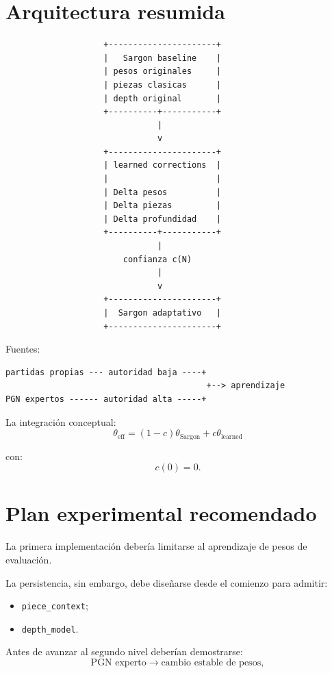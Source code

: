 \documentclass[11pt,a4paper]{article}
\begin{document}
\section{Arquitectura resumida}
\begin{verbatim}
                    +----------------------+
                    |   Sargon baseline    |
                    | pesos originales     |
                    | piezas clasicas      |
                    | depth original       |
                    +----------+-----------+
                               |
                               v
                    +----------------------+
                    | learned corrections  |
                    |                      |
                    | Delta pesos          |
                    | Delta piezas         |
                    | Delta profundidad    |
                    +----------+-----------+
                               |
                        confianza c(N)
                               |
                               v
                    +----------------------+
                    |  Sargon adaptativo   |
                    +----------------------+
\end{verbatim}

Fuentes:
\begin{verbatim}
partidas propias --- autoridad baja ----+
                                         +--> aprendizaje
PGN expertos ------ autoridad alta -----+
\end{verbatim}

La integración conceptual:
\[
\boxed{
\theta_{\text{eff}}
=
(1-c)\theta_{\text{Sargon}}
+
c\theta_{\text{learned}}
}
\]

con:
\[
c(0)=0.
\]

\section{Plan experimental recomendado}
La primera implementación debería limitarse al aprendizaje de pesos de evaluación.

La persistencia, sin embargo, debe diseñarse desde el comienzo para admitir:
\begin{itemize}
    \item \texttt{piece\_context};
    \item \texttt{depth\_model}.
\end{itemize}

Antes de avanzar al segundo nivel deberían demostrarse:
\[
\text{PGN experto}
\rightarrow
\text{cambio estable de pesos},
\]
\end{document}
